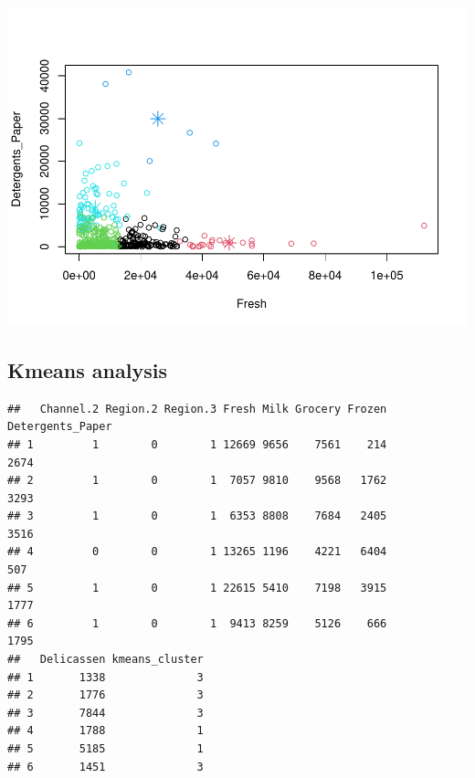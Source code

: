 \documentclass[
  english,
  man]{apa6}
\newenvironment{Shaded}{\begin{snugshade}}{\end{snugshade}}
\newcommand{\KeywordTok}[1]{\textcolor[rgb]{0.13,0.29,0.53}{\textbf{#1}}}
\newcommand{\NormalTok}[1]{#1}
\newcommand{\OperatorTok}[1]{\textcolor[rgb]{0.81,0.36,0.00}{\textbf{#1}}}
\newcommand{\StringTok}[1]{\textcolor[rgb]{0.31,0.60,0.02}{#1}}
\begin{document}
\includegraphics{MSDS680-Week-6-Kmeans-and-HCA_files/figure-latex/kmeans plots-2.pdf}

\hypertarget{kmeans-analysis}{%
\subsection{Kmeans analysis}\label{kmeans-analysis}}

\begin{Shaded}
\end{Shaded}

\begin{verbatim}
##   Channel.2 Region.2 Region.3 Fresh Milk Grocery Frozen Detergents_Paper
## 1         1        0        1 12669 9656    7561    214             2674
## 2         1        0        1  7057 9810    9568   1762             3293
## 3         1        0        1  6353 8808    7684   2405             3516
## 4         0        0        1 13265 1196    4221   6404              507
## 5         1        0        1 22615 5410    7198   3915             1777
## 6         1        0        1  9413 8259    5126    666             1795
##   Delicassen kmeans_cluster
## 1       1338              3
## 2       1776              3
## 3       7844              3
## 4       1788              1
## 5       5185              1
## 6       1451              3
\end{verbatim}
\end{document}
